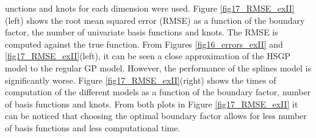 \documentclass[]{interact}
\theoremstyle{plain}%
\theoremstyle{definition}
\theoremstyle{remark}
\begin{document}
unctions and knots for each dimension were used. Figure \ref{fig17_RMSE_exII}(left) shows the root mean squared error (RMSE) as a function of the boundary factor, the number of univariate basis functions and knots. The RMSE is computed against the true function. From Figures \ref{fig16_errors_exII} and \ref{fig17_RMSE_exII}(left), it can be seen a close approximation of the HSGP model to the regular GP model. However, the performance of the splines model is significantly worse. Figure \ref{fig17_RMSE_exII}(right) shows the times of computation of the different models as a function of the boundary factor, number of basis functions and knots. From both plots in Figure \ref{fig17_RMSE_exII} it can be noticed that choosing the optimal boundary factor allows for less number of basis functions and less computational time.
\end{document}
